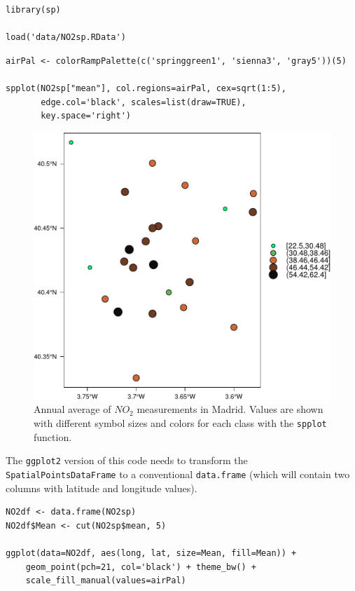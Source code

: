 \documentclass[smallroyalvopaper]{memoir}
\begin{document}
\lstset{language=R,numbers=none}
\begin{lstlisting}
library(sp)

load('data/NO2sp.RData')
\end{lstlisting}

\lstset{language=R,numbers=none}
\begin{lstlisting}
airPal <- colorRampPalette(c('springgreen1', 'sienna3', 'gray5'))(5)

spplot(NO2sp["mean"], col.regions=airPal, cex=sqrt(1:5),
       edge.col='black', scales=list(draw=TRUE),
       key.space='right')
\end{lstlisting}

\begin{figure}[htb]
\centering
\includegraphics[width=.9\linewidth]{figs/airMadrid_spplot.pdf}
\caption{\label{fig:airMadrid_spplot}Annual average of $NO_2$ measurements in Madrid. Values are shown with different symbol sizes and  colors for each class with the \texttt{spplot} function.}
\end{figure}

The \texttt{ggplot2} version of this code needs to transform the
\texttt{SpatialPointsDataFrame} to a conventional \texttt{data.frame} (which
will contain two columns with latitude and longitude values).
\lstset{language=R,numbers=none}
\begin{lstlisting}
NO2df <- data.frame(NO2sp)
NO2df$Mean <- cut(NO2sp$mean, 5)

ggplot(data=NO2df, aes(long, lat, size=Mean, fill=Mean)) +
    geom_point(pch=21, col='black') + theme_bw() +
    scale_fill_manual(values=airPal)
\end{lstlisting}
\end{document}
